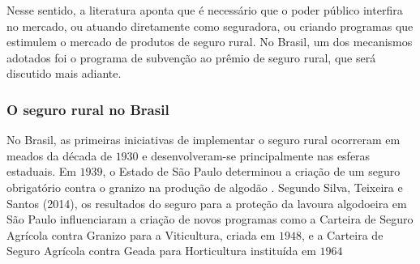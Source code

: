 \documentclass[12pt,a4paper]{article}
\begin{document}


Nesse sentido,  a literatura aponta que é necessário que o poder público interfira no mercado, ou atuando diretamente como seguradora, ou criando programas que estimulem o mercado de produtos de seguro rural. No Brasil, um dos mecanismos adotados foi o programa de subvenção ao prêmio de seguro rural, que será discutido mais adiante. 

\subsubsection{O seguro rural no Brasil}

No Brasil, as primeiras iniciativas de implementar o seguro rural ocorreram em meados da década de $1930$ e desenvolveram-se principalmente nas esferas estaduais. Em $1939$, o Estado de São Paulo determinou a criação de um seguro obrigatório contra o granizo na produção de algodão \cite{maia11}. Segundo Silva, Teixeira e Santos (2014), os resultados do seguro para a proteção da lavoura algodoeira em São Paulo influenciaram a criação de novos programas como a Carteira de Seguro Agrícola contra Granizo para a Viticultura, criada em $1948$, e a Carteira de Seguro Agrícola contra Geada para Horticultura instituída em $1964$
\end{document}
